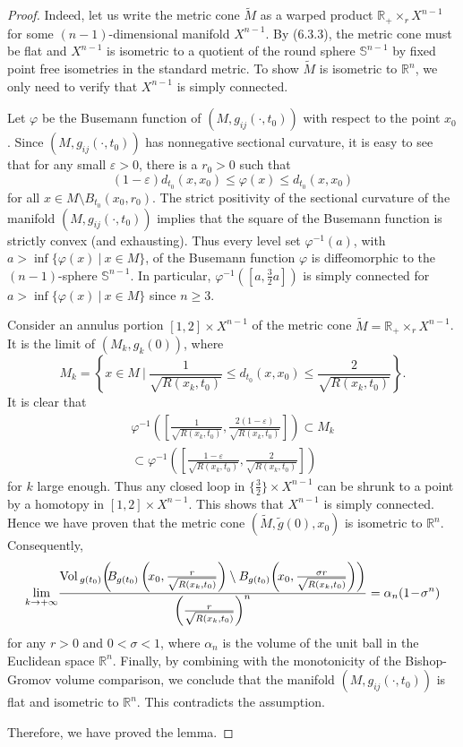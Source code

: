 \begin{proof}
Indeed, let us write the metric cone $\tilde{M}$ as a warped
product $\mathbb{R}_{+}\times_r X^{n-1}$ for some
$(n-1)$-dimensional manifold $X^{n-1}$. By (6.3.3), the metric
cone must be flat and $X^{n-1}$ is isometric to a quotient of the
round sphere $\mathbb{S}^{n-1}$ by fixed point free isometries in
the standard metric. To show $\tilde{M}$ is isometric to
$\mathbb{R}^n$, we only need to verify that $X^{n-1}$ is simply
connected.

Let $\varphi$ be the Busemann function of $(M,g_{ij}(\cdot,t_0))$
with respect to the point $x_0$. Since $(M,g_{ij}(\cdot,t_0))$ has
nonnegative sectional curvature, it is easy to see that for any
small $\varepsilon >0$, there is a $r_0 >0$ such that
$$(1-\varepsilon)d_{t_0}(x,x_0) \leq \varphi(x) \leq
d_{t_0}(x,x_0)$$ for all $x \in M\setminus B_{t_0}(x_0,r_0)$. The
strict positivity of the sectional curvature of the manifold
$(M,g_{ij}(\cdot,t_0))$ implies that the square of the Busemann
function is strictly convex (and exhausting). Thus every level set
$\varphi^{-1}(a)$, with $a > \inf \{\varphi(x)\ |\ x \in M \}$, of
the Busemann function $\varphi$ is diffeomorphic to the
$(n-1)$-sphere $\mathbb{S}^{n-1}$. In particular,
$\varphi^{-1}([a,\frac{3}{2}a])$ is simply connected for $a > \inf
\{\varphi(x)\ |\ x \in M \}$ since $n \geq 3$.

Consider an annulus portion $[1,2]\times X^{n-1}$ of the metric
cone $\tilde{M} = \mathbb{R}_+\times_r X^{n-1}$. It is the limit
of $(M_k,g_k(0))$, where
$$
M_k = \left\{ x \in M \ \Big|\  \frac{1}{\sqrt{R(x_k,t_0)}} \leq
d_{t_0}(x,x_0) \leq \frac{2}{\sqrt{R(x_k,t_0)}} \right\}.
$$
It is clear that
\begin{multline*}
\varphi^{-1}\left(\left[\frac{1}{\sqrt{R(x_k,t_0)}},
\frac{2(1-\varepsilon)}{\sqrt{R(x_k,t_0)}}\right]\right)
\subset M_k \\
\subset
\varphi^{-1}\left(\left[\frac{1-\varepsilon}{\sqrt{R(x_k,t_0)}},
\frac{2}{\sqrt{R(x_k,t_0)}}\right]\right)\!\!\!
\end{multline*}
for $k$ large enough. Thus any closed loop in $\{\frac{3}{2}\}
\times X^{n-1}$ can be shrunk to a point by a homotopy in
$[1,2]\times X^{n-1}$. This shows that $X^{n-1}$ is simply
connected. Hence we have proven that the metric cone
$(\tilde{M},\tilde{g}(0),x_0)$ is isometric to $\mathbb{R}^n$.
Consequently,
$$
\lim_{k\rightarrow+\infty}\!\frac{\Vol_{g(t_0)}\!\left(\!\!B_{g(t_0)}
\left(\!x_0,\frac{r}{\sqrt{R(x_k,t_0)}}\right)\setminus
B_{g(t_0)}\!\left(\!x_0,\frac{\sigma r}{\sqrt{R(x_k,t_0)}}\right)\right)}{
\left(\frac{r}{\sqrt{R(x_k,t_0)}}\right)^n} = \alpha_n (1\!-\!\sigma^n)
$$
for any $r>0$ and $0<\sigma<1$, where $\alpha_n$ is the volume of
the unit ball in the Euclidean space $\mathbb{R}^n$. Finally, by
combining with the monotonicity of the Bishop-Gromov volume
comparison, we conclude that the manifold $(M,g_{ij}(\cdot,t_0))$
is flat and isometric to $\mathbb{R}^n$. This contradicts the
assumption.

Therefore, we have proved the lemma.
\end{proof}

